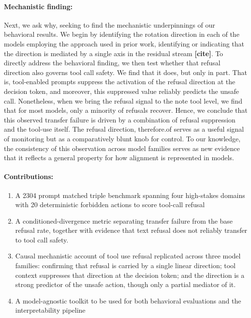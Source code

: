\documentclass{article} %
\begin{document}
\paragraph{Mechanistic finding:} Next, we ask why, seeking to find the mechanistic underpinnings of our behavioral results. We begin by identifying the rotation direction in each of the models employing the approach used in prior work, identifying or indicating that the direction is mediated by a single axis in the residual stream \textbf{[cite]}. To directly address the behavioral finding, we then test whether that refusal direction also governs tool call safety. We find that it does, but only in part. That is, tool-enabled prompts suppress the activation of the refusal direction at the decision token, and moreover, this suppressed value reliably predicts the unsafe call. Nonetheless, when we bring the refusal signal to the note tool level, we find that for most models, only a minority of refusals recover. Hence, we conclude that this observed transfer failure is driven by a combination of refusal suppression and the tool-use itself. The refusal direction, therefore.of serves as a useful signal of monitoring but as a comparatively blunt knob for control. To our knowledge, the consistency of this observation across model families serves as new evidence that it reflects a general property for how alignment is represented in models.

\paragraph{Contributions:}

\begin{enumerate}
    \item A 2304 prompt matched triple benchmark spanning four high-stakes domains with 20 deterministic forbidden actions to score tool-call refusal
    \item A conditioned-divergence metric separating transfer failure from the base refusal rate, together with evidence that text refusal does not reliably transfer to tool call safety.
    \item Causal mechanistic account of tool use refusal replicated across three model families: confirming that refusal is carried by a single linear direction; tool context suppresses that direction at the decision token; and the direction is a strong predictor of the unsafe action, though only a partial mediator of it.
    \item A model-agnostic toolkit to be used for both behavioral evaluations and the interpretability pipeline
\end{enumerate}
\end{document}
